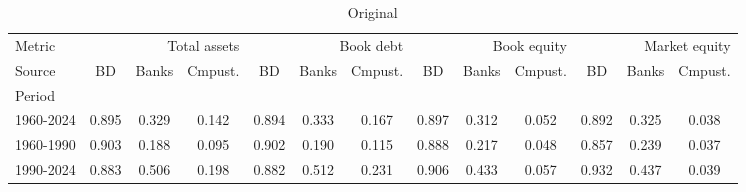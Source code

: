 
    \begin{table}[htbp]
      \centering
      \caption{Original}
      \label{tab:Table 2}
      \small
      \begin{tabular}{lcccccccccccc}
\toprule
Metric & \multicolumn{3}{r}{Total assets} & \multicolumn{3}{r}{Book debt} & \multicolumn{3}{r}{Book equity} & \multicolumn{3}{r}{Market equity} \\
Source & BD & Banks & Cmpust. & BD & Banks & Cmpust. & BD & Banks & Cmpust. & BD & Banks & Cmpust. \\
Period &  &  &  &  &  &  &  &  &  &  &  &  \\
\midrule
1960-2024 & 0.895 & 0.329 & 0.142 & 0.894 & 0.333 & 0.167 & 0.897 & 0.312 & 0.052 & 0.892 & 0.325 & 0.038 \\
1960-1990 & 0.903 & 0.188 & 0.095 & 0.902 & 0.190 & 0.115 & 0.888 & 0.217 & 0.048 & 0.857 & 0.239 & 0.037 \\
1990-2024 & 0.883 & 0.506 & 0.198 & 0.882 & 0.512 & 0.231 & 0.906 & 0.433 & 0.057 & 0.932 & 0.437 & 0.039 \\
\bottomrule
\end{tabular}

    \end{table}
    